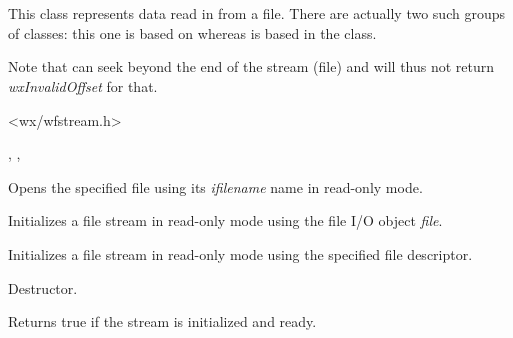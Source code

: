 \section{}\label{wxfileinputstream}

This class represents data read in from a file. There are actually
two such groups of classes: this one is based on  
whereas  is based in
the  class.

Note that  
can seek beyond the end of the stream (file) and will thus not return 
{\it wxInvalidOffset} for that.




<wx/wfstream.h>




, , 


\label{wxfileinputstreamctor}


Opens the specified file using its {\it ifilename} name in read-only mode.


Initializes a file stream in read-only mode using the file I/O object {\it file}.


Initializes a file stream in read-only mode using the specified file descriptor.

\label{wxfileinputstreamdtor}


Destructor.

\label{wxfileinputstreamisok}


Returns true if the stream is initialized and ready.

